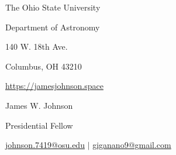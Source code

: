 \documentclass[cv.tex]{subfiles}
\begin{document}
\begin{center}
\parbox{.3\textwidth}{%
	\raggedleft
	The Ohio State University \par
	Department of Astronomy \par
	140 W. 18th Ave. \par
	Columbus, OH 43210 \par
	\url{https://jamesjohnson.space}
}
\hspace{1mm}
\vrule height 1.5cm width 0.4pt
\hspace{1mm}
\parbox{0.5\textwidth}{%
	{%
	\fontsize{30}{36} \selectfont James W. Johnson \par
	\fontsize{18}{25} \selectfont Presidential Fellow \par
	\fontsize{11}{13} \selectfont
	\vspace{0.1cm}
	\href{mailto:johnson.7419@osu.edu}{johnson.7419@osu.edu} $\vert$
	\href{mailto:giganano9@gmail.com}{giganano9@gmail.com}
	}
}
\end{center}
\end{document}
